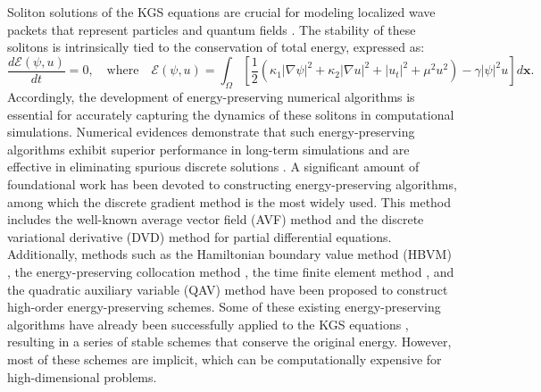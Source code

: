 \documentclass[fleqn,11pt]{elsarticle}
\numberwithin{equation}{section}
\begin{document}
Soliton solutions of the KGS equations are crucial for modeling localized wave packets that represent particles and quantum fields \cite{Makhankov1978,Hioe-2003}. The stability of these solitons is intrinsically tied to the conservation of total energy, expressed as:
\begin{equation}\label{ene-origin}
	\frac{d\mathcal{E}(\psi, u)}{dt} = 0, \quad \text{where} \quad \mathcal{E}(\psi, u) = \int_\Omega \left[ \frac{1}{2} \left(\kappa_1 |\nabla \psi|^2 + \kappa_2 |\nabla u|^2 + |u_t|^2 + \mu^2 u^2 \right) - \gamma |\psi|^2 u \right] d \bm{x}.
\end{equation}
Accordingly, the development of energy-preserving numerical algorithms is essential for accurately capturing the dynamics of these solitons in computational simulations. Numerical evidences demonstrate that such energy-preserving algorithms exhibit superior performance in long-term simulations and are effective in eliminating spurious discrete solutions \cite{vu-quoc1993,li1995,sharma2020}. A significant amount of foundational work has been devoted to constructing energy-preserving algorithms, among which the discrete gradient method \cite{itoh1988,gonzalez1996,mclachlan1999geometric} is the most widely used. This method includes the well-known average vector field (AVF) method \cite{avfJcp,avfJPA,avf6} and the discrete variational derivative (DVD) method \cite{furihata1999,furihata2018} for partial differential equations. Additionally, methods such as the Hamiltonian boundary value method (HBVM) \cite{HBVM1,luiji_book}, the energy-preserving collocation method \cite{hairer2010a}, the time finite element method \cite{tangTFE}, and the quadratic auxiliary variable (QAV) method \cite{gongQAV,qavSIAM} have been proposed to construct high-order energy-preserving schemes. Some of these existing energy-preserving algorithms have already been successfully applied to the KGS equations \cite{dgkgs_anm,dgkgs_amm,kgs_hbvms,fujsc}, resulting in a series of stable schemes that conserve the original energy. However, most of these schemes are implicit, which can be computationally expensive for high-dimensional problems.
\end{document}
